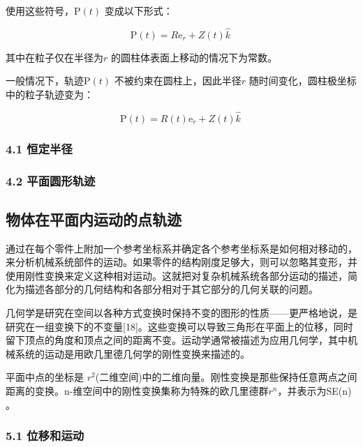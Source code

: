 使用这些符号，$\mathrm{P}(t)$ 变成以下形式：

\begin{equation}
\mathrm{P}(t) = R\mathrm{e}_r + Z(t)\hat{k}~
\end{equation}

其中在粒子仅在半径为$r$ 的圆柱体表面上移动的情况下为常数。

一般情况下，轨迹$\mathrm{P}(t)$ 不被约束在圆柱上，因此半径$r$ 随时间变化，圆柱极坐标中的粒子轨迹变为：

\begin{equation}
\mathrm{P}(t) = R(t)\mathrm{e}_r + Z(t)\hat{k}~
\end{equation}




\subsubsection{4.1 恒定半径}



\subsubsection{4.2 平面圆形轨迹}



\subsection{物体在平面内运动的点轨迹}

通过在每个零件上附加一个参考坐标系并确定各个参考坐标系是如何相对移动的，来分析机械系统部件的运动。如果零件的结构刚度足够大，则可以忽略其变形，并使用刚性变换来定义这种相对运动。这就把对复杂机械系统各部分运动的描述，简化为描述各部分的几何结构和各部分相对于其它部分的几何关联的问题。

几何学是研究在空间以各种方式变换时保持不变的图形的性质——更严格地说，是研究在一组变换下的不变量[18]。这些变换可以导致三角形在平面上的位移，同时留下顶点的角度和顶点之间的距离不变。运动学通常被描述为应用几何学，其中机械系统的运动是用欧几里德几何学的刚性变换来描述的。

平面中点的坐标是 $r^2$(二维空间)中的二维向量。刚性变换是那些保持任意两点之间距离的变换。n-维空间中的刚性变换集称为特殊的欧几里德群$r^n$，并表示为SE(n) 。

\subsubsection{5.1 位移和运动}


